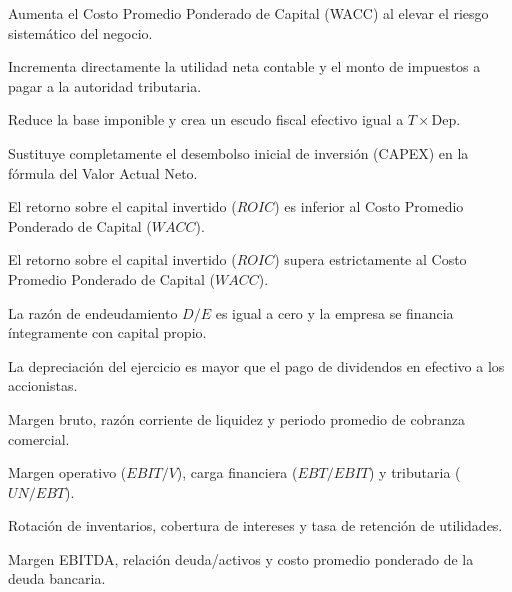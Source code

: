\begin{opts}
    \item Aumenta el Costo Promedio Ponderado de Capital (WACC) al elevar el riesgo sistemático del negocio.
    \item Incrementa directamente la utilidad neta contable y el monto de impuestos a pagar a la autoridad tributaria.
    \item Reduce la base imponible y crea un escudo fiscal efectivo igual a $T \times \text{Dep}$.
    \item Sustituye completamente el desembolso inicial de inversión (CAPEX) en la fórmula del Valor Actual Neto.
\end{opts}

\begin{opts}
    \item El retorno sobre el capital invertido ($ROIC$) es inferior al Costo Promedio Ponderado de Capital ($WACC$).
    \item El retorno sobre el capital invertido ($ROIC$) supera estrictamente al Costo Promedio Ponderado de Capital ($WACC$).
    \item La razón de endeudamiento $D/E$ es igual a cero y la empresa se financia íntegramente con capital propio.
    \item La depreciación del ejercicio es mayor que el pago de dividendos en efectivo a los accionistas.
\end{opts}

\begin{opts}
    \item Margen bruto, razón corriente de liquidez y periodo promedio de cobranza comercial.
    \item Margen operativo ($EBIT/V$), carga financiera ($EBT/EBIT$) y tributaria ($UN/EBT$).
    \item Rotación de inventarios, cobertura de intereses y tasa de retención de utilidades.
    \item Margen EBITDA, relación deuda/activos y costo promedio ponderado de la deuda bancaria.
\end{opts}

